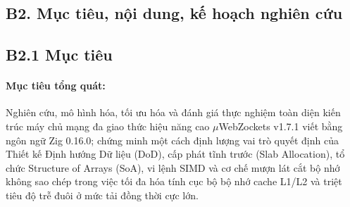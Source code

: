 \documentclass[letterpaper]{article}
\begin{document}
\begin{table}[!hbt]
\centering
\small
\caption{Bảng đối sánh thực nghiệm toàn diện các Web Framework trên nền tảng Zig độc lập (\url{https://bench.zig.bd/} và HttpArena PR \#1536)}
\label{tab:zig-bench-vn}
\end{table}

\subsection{B2. Mục tiêu, nội dung, kế hoạch nghiên cứu}

\subsection{B2.1 Mục tiêu}
\paragraph{Mục tiêu tổng quát:}
Nghiên cứu, mô hình hóa, tối ưu hóa và đánh giá thực nghiệm toàn diện kiến trúc máy chủ mạng đa giao thức hiệu năng cao $\mu$WebZockets v1.7.1 viết bằng ngôn ngữ Zig 0.16.0; chứng minh một cách định lượng vai trò quyết định của Thiết kế Định hướng Dữ liệu (DoD), cấp phát tĩnh trước (Slab Allocation), tổ chức Structure of Arrays (SoA), vi lệnh SIMD và cơ chế mượn lát cắt bộ nhớ không sao chép trong việc tối đa hóa tính cục bộ bộ nhớ cache L1/L2 và triệt tiêu độ trễ đuôi ở mức tải đồng thời cực lớn.
\end{document}
